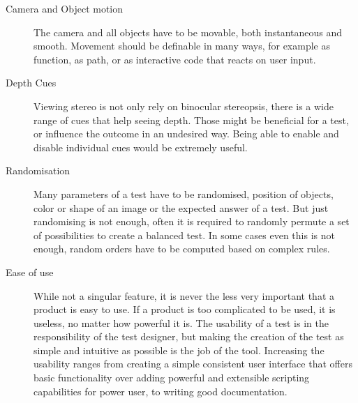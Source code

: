 \begin{description}
\item[Camera and Object motion]
The camera and all objects have to be movable, both instantaneous and smooth.
Movement should be definable in many ways, for example as function, as path, or as interactive code that reacts on user input.

\item[Depth Cues]
Viewing stereo is not only rely on binocular stereopsis, there is a wide range of cues that help seeing depth.
Those might be beneficial for a test, or influence the outcome in an undesired way.
Being able to enable and disable individual cues would be extremely useful.

\item[Randomisation]
Many parameters of a test have to be randomised, position of objects, color or shape of an image or the expected answer of a test.
But just randomising is not enough, often it is required to randomly permute a set of possibilities to create a balanced test.
In some cases even this is not enough, random orders have to be computed based on complex rules.

\item[Ease of use]
While not a singular feature, it is never the less very important that a product is easy to use.
If a product is too complicated to be used, it is useless, no matter how powerful it is.
The usability of a test is in the responsibility of the test designer, but making the creation of the test as simple and intuitive as possible is the job of the tool.
Increasing the usability ranges from creating a simple consistent user interface that offers basic functionality over adding powerful and extensible scripting capabilities for power user, to writing good documentation.
\end{description}
